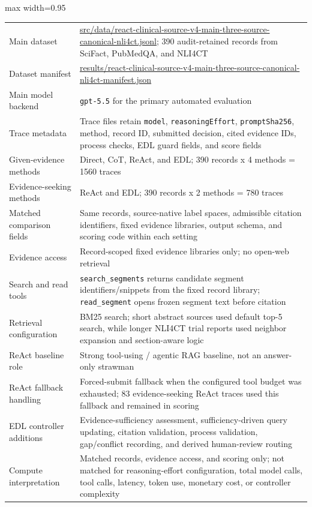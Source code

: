 \documentclass[
  8pt,
]{extarticle}
\begin{document}
\begin{center}
\begin{adjustbox}{max width=0.95\textwidth}
\begin{tabular}{@{}
ll@{}}
Main dataset &
\url{src/data/react-clinical-source-v4-main-three-source-canonical-nli4ct.jsonl};
390 audit-retained records from SciFact, PubMedQA, and NLI4CT \\
Dataset manifest &
\url{results/react-clinical-source-v4-main-three-source-canonical-nli4ct-manifest.json} \\
Main model backend & \texttt{gpt-5.5} for the primary automated
evaluation \\
Trace metadata & Trace files retain \texttt{model},
\texttt{reasoningEffort}, \texttt{promptSha256}, method, record ID,
submitted decision, cited evidence IDs, process checks, EDL guard
fields, and score fields \\
Given-evidence methods & Direct, CoT, ReAct, and EDL; 390 records x 4
methods = 1560 traces \\
Evidence-seeking methods & ReAct and EDL; 390 records x 2 methods = 780
traces \\
Matched comparison fields & Same records, source-native label spaces,
admissible citation identifiers, fixed evidence libraries, output
schema, and scoring code within each setting \\
Evidence access & Record-scoped fixed evidence libraries only; no
open-web retrieval \\
Search and read tools & \texttt{search\_segments} returns candidate
segment identifiers/snippets from the fixed record library;
\texttt{read\_segment} opens frozen segment text before citation \\
Retrieval configuration & BM25 search; short abstract sources used
default top-5 search, while longer NLI4CT trial reports used neighbor
expansion and section-aware logic \\
ReAct baseline role & Strong tool-using / agentic RAG baseline, not an
answer-only strawman \\
ReAct fallback handling & Forced-submit fallback when the configured
tool budget was exhausted; 83 evidence-seeking ReAct traces used this
fallback and remained in scoring \\
EDL controller additions & Evidence-sufficiency assessment,
sufficiency-driven query updating, citation validation, process
validation, gap/conflict recording, and derived human-review routing \\
Compute interpretation & Matched records, evidence access, and scoring
only; not matched for reasoning-effort configuration, total model calls,
tool calls, latency, token use, monetary cost, or controller
complexity \\

\end{tabular}
\end{adjustbox}
\end{center}
\end{document}
